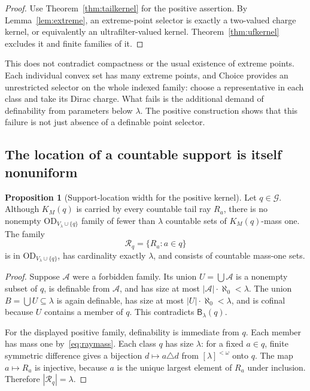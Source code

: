\documentclass[11pt,letterpaper]{article}
\theoremstyle{definition}
\newtheorem{proposition}[definition]{Proposition}
\newcommand{\OD}{\mathrm{OD}}
\newcommand{\Blam}[1]{\mathsf B_\lambda(#1)}
\newcommand{\ODq}{\OD_{V_\lambda\cup\{q\}}}
\begin{document}
\begin{proof}
Use Theorem~\ref{thm:tailkernel} for the positive assertion. By Lemma~\ref{lem:extreme}, an extreme-point selector is exactly a two-valued charge kernel, or equivalently an ultrafilter-valued kernel. Theorem~\ref{thm:ufkernel} excludes it and finite families of it.
\end{proof}

This does not contradict compactness or the usual existence of extreme points. Each individual convex set has many extreme points, and Choice provides an unrestricted selector on the whole indexed family: choose a representative in each class and take its Dirac charge. What fails is the additional demand of definability from parameters below $\lambda$. The positive construction shows that this failure is not just absence of a definable point selector.

\subsection{The location of a countable support is itself nonuniform}

\begin{proposition}[Support-location width for the positive kernel]\label{prop:support}
Let $q\in\mathcal G$. Although $K_M(q)$ is carried by every countable tail ray $R_a$, there is no nonempty $\ODq$ family of fewer than $\lambda$ countable sets of $K_M(q)$-mass one. The family
\[
 \mathcal R_q=\{R_a:a\in q\}
\]
is in $\ODq$, has cardinality exactly $\lambda$, and consists of countable mass-one sets.
\end{proposition}

\begin{proof}
Suppose $\mathcal A$ were a forbidden family. Its union $U=\bigcup\mathcal A$ is a nonempty subset of $q$, is definable from $\mathcal A$, and has size at most $|\mathcal A|\cdot\aleph_0<\lambda$. The union $B=\bigcup U\subseteq\lambda$ is again definable, has size at most $|U|\cdot\aleph_0<\lambda$, and is cofinal because $U$ contains a member of $q$. This contradicts $\Blam q$.

For the displayed positive family, definability is immediate from $q$. Each member has mass one by~\eqref{eq:raymass}. Each class $q$ has size $\lambda$: for a fixed $a\in q$, finite symmetric difference gives a bijection $d\mapsto a\triangle d$ from $[\lambda]^{<\omega}$ onto $q$. The map $a\mapsto R_a$ is injective, because $a$ is the unique largest element of $R_a$ under inclusion. Therefore $|\mathcal R_q|=\lambda$.
\end{proof}
\end{document}
